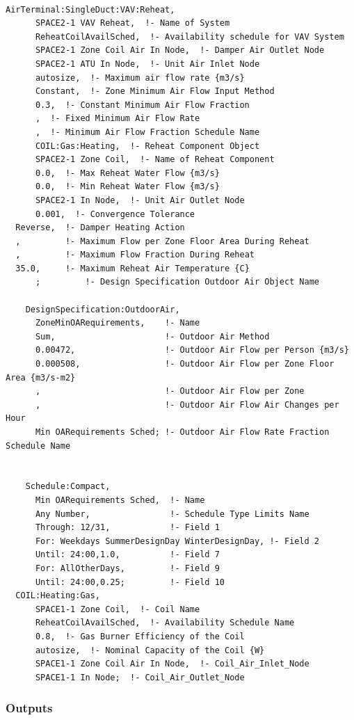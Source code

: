 \begin{lstlisting}

AirTerminal:SingleDuct:VAV:Reheat,
      SPACE2-1 VAV Reheat,  !- Name of System
      ReheatCoilAvailSched,  !- Availability schedule for VAV System
      SPACE2-1 Zone Coil Air In Node,  !- Damper Air Outlet Node
      SPACE2-1 ATU In Node,  !- Unit Air Inlet Node
      autosize,  !- Maximum air flow rate {m3/s}
      Constant,  !- Zone Minimum Air Flow Input Method
      0.3,  !- Constant Minimum Air Flow Fraction
      ,  !- Fixed Minimum Air Flow Rate
      ,  !- Minimum Air Flow Fraction Schedule Name
      COIL:Gas:Heating,  !- Reheat Component Object
      SPACE2-1 Zone Coil,  !- Name of Reheat Component
      0.0,  !- Max Reheat Water Flow {m3/s}
      0.0,  !- Min Reheat Water Flow {m3/s}
      SPACE2-1 In Node,  !- Unit Air Outlet Node
      0.001,  !- Convergence Tolerance
  Reverse,  !- Damper Heating Action
  ,         !- Maximum Flow per Zone Floor Area During Reheat
  ,         !- Maximum Flow Fraction During Reheat
  35.0,     !- Maximum Reheat Air Temperature {C}
      ;         !- Design Specification Outdoor Air Object Name

    DesignSpecification:OutdoorAir,
      ZoneMinOARequirements,    !- Name
      Sum,                      !- Outdoor Air Method
      0.00472,                  !- Outdoor Air Flow per Person {m3/s}
      0.000508,                 !- Outdoor Air Flow per Zone Floor Area {m3/s-m2}
      ,                         !- Outdoor Air Flow per Zone
      ,                         !- Outdoor Air Flow Air Changes per Hour
      Min OARequirements Sched; !- Outdoor Air Flow Rate Fraction Schedule Name


    Schedule:Compact,
      Min OARequirements Sched,  !- Name
      Any Number,                !- Schedule Type Limits Name
      Through: 12/31,            !- Field 1
      For: Weekdays SummerDesignDay WinterDesignDay, !- Field 2
      Until: 24:00,1.0,          !- Field 7
      For: AllOtherDays,         !- Field 9
      Until: 24:00,0.25;         !- Field 10
  COIL:Heating:Gas,
      SPACE1-1 Zone Coil,  !- Coil Name
      ReheatCoilAvailSched,  !- Availability Schedule Name
      0.8,  !- Gas Burner Efficiency of the Coil
      autosize,  !- Nominal Capacity of the Coil {W}
      SPACE1-1 Zone Coil Air In Node,  !- Coil_Air_Inlet_Node
      SPACE1-1 In Node;  !- Coil_Air_Outlet_Node
\end{lstlisting}

\subsubsection{Outputs}\label{outputs-2-000}

